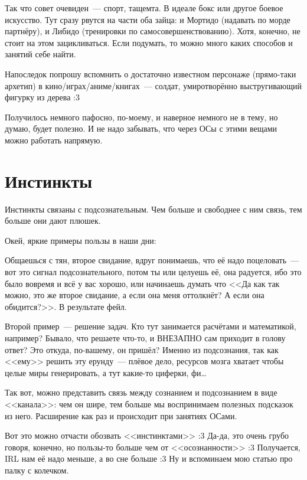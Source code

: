 \documentclass[a4paper,14pt,oneside]{memoir}
\begin{document}
Так что совет очевиден~--- спорт, тащемта. В идеале бокс или другое боевое искусство. Тут сразу рвутся на части оба зайца: и Мортидо (надавать по морде партнёру), и Либидо (тренировки по самосовершенствованию). Хотя, конечно, не стоит на этом зацикливаться. Если подумать, то можно много каких способов и занятий себе найти. 

Напоследок попрошу вспомнить о достаточно известном персонаже (прямо-таки архетип) в кино/играх/аниме/книгах~--- солдат, умиротворённо выстругивающий фигурку из дерева :3

Получилось немного пафосно, по-моему, и наверное немного не в тему, но думаю, будет полезно. И не надо забывать, что через ОСы с этими вещами можно работать напрямую. 




\section{Инстинкты}
Инстинкты связаны с подсознательным. Чем больше и свободнее с ним связь, тем больше они дают плюшек.
 
Окей, яркие примеры пользы в наши дни:

Общаешься с тян, второе свидание, вдруг понимаешь, что её надо поцеловать~--- вот это сигнал подсознательного, потом ты или целуешь её, она радуется, ибо это было вовремя и всё у вас хорошо, или начинаешь думать что <<Да как так можно, это же второе свидание, а если она меня оттолкнёт? А если она обидится?>>. В результате фейл. 

Второй пример~--- решение задач. Кто тут занимается расчётами и математикой, например? Бывало, что решаете что-то, и ВНЕЗАПНО сам приходит в голову ответ? Это откуда, по-вашему, он пришёл? Именно из подсознания, так как <<ему>> решить эту ерунду~--- плёвое дело, ресурсов мозга хватает чтобы целые миры генерировать, а тут какие-то циферки, фи\ldots
 
Так вот, можно представить связь между сознанием и подсознанием в виде <<канала>>: чем он шире, тем больше мы воспринимаем полезных подсказок из него. Расширение как раз и происходит при занятиях ОСами. 

Вот это можно отчасти обозвать <<инстинктами>> :3 Да-да, это очень грубо говоря, конечно, но пользы-то больше чем от <<осознанности>> :3 Получается, IRL нам её надо меньше, а во сне больше :3 Ну и вспоминаем мою статью про палку с колечком. 

\bigskip

\end{document}
